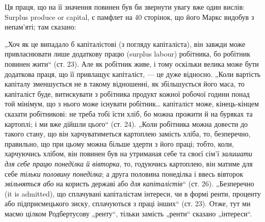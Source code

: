 \parcont{}  %
Ця праця, що на її значення повинен був би звернути увагу вже один
вислів: Surplus produce or capital, є памфлет на 40 сторінок, що його
Маркс видобув з непам’яті; там сказано:

„Хоч як це випадало б капіталістові (з погляду капіталіста), він
завжди може привласнювати лише додаткову працю (surplus labour) робітника,
бо робітник повинен жити“ (ст. 23). Але як робітник живе,
і тому оскільки велика може бути додаткова праця, що її привлащує
капіталіст, — це дуже відносно. „Коли вартість капіталу зменшується
не в такому відношенні, як збільшується його маса, то капіталіст буде,
витискувати з робітника продукт кожної робочої години понад той мінімум,
що з нього може існувати робітник\dots{} капіталіст може, кінець-кінцем
сказати робітникові: не треба тобі їсти хліб, бо можна прожити й на
буряках та картоплі; і ми вже дійшли цього“ (ст. 24). „Коли робітника
можна довести до такого стану, що він харчуватиметься картоплею замість
хліба, то, безперечно, правильно, що при цьому можна більше здерти з
його праці; тобто, коли, харчуючись хлібом, він повинен був на утриманая
себе та своєї сім’ї  \emph{залишати для себе працю понеділка й вівторка},
то, годуючись картоплею, він матиме для себе  \emph{тільки половину понеділка};
а друга половина понеділка і ввесь вівторок  \emph{звільняться або} на користь
державі або  \emph{для капіталістів}“ (ст. 26). „Безперечно (it is admitted),
що сплачувані капіталістам інтереси, чи в формі ренти, проценту або
підприємецького зиску, сплачуються з праці інших“ (ст. 23). Отже, тут
ми маємо цілком Родбертусову „ренту“, тільки замість „ренти“ сказано
„інтереси“.

